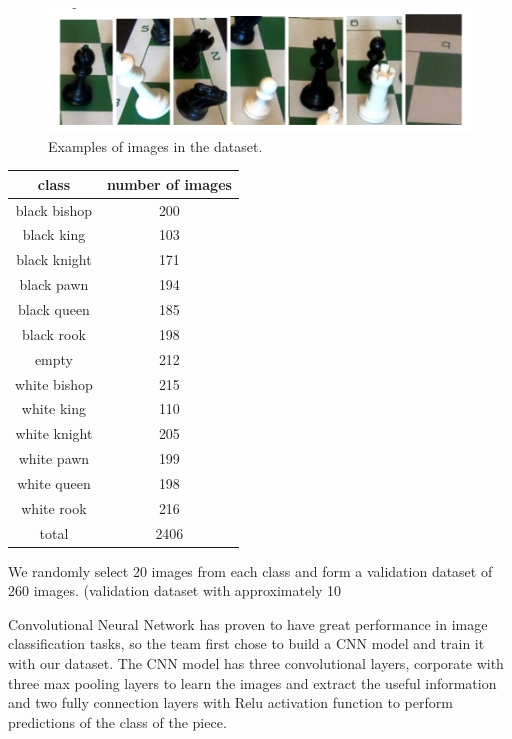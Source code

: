 \documentclass[a4paper,12pt]{article}
\begin{document}
\begin{spacing}{1.3}
\begin{figure}[H]
	\centering
	\includegraphics[scale=0.4]{7.png}
	\caption{Examples of images in the dataset.}
\end{figure}

\begin{center}
	\begin{tabular}{|c|c|} \hline
		class &number of images \\ \hline
		black bishop &200 \\  \hline
		black king & 103 \\ \hline
		black knight & 171 \\ \hline
	black pawn & 194 \\ \hline
		black queen& 185 \\ \hline
		black rook& 198 \\ \hline
		empty & 212 \\ \hline
		white bishop & 215 \\ \hline
		white king& 110 \\ \hline
		white knight & 205 \\ \hline
		white pawn & 199 \\ \hline
		white queen& 198 \\ \hline
		white rook& 216 \\ \hline
		total & 2406 \\ \hline
	\end{tabular}
\end{center}

We randomly select 20 images from each class and form a validation dataset of 260 images. (validation dataset with approximately 10%

Convolutional Neural Network has proven to have great performance in image classification tasks, so the team first chose to build a CNN model and train it with our dataset. The CNN model has three convolutional layers, corporate with three max pooling layers to learn the images and extract the useful information and two fully connection layers with Relu activation function to perform predictions of the class of the piece. 


\end{spacing}
\end{document}

